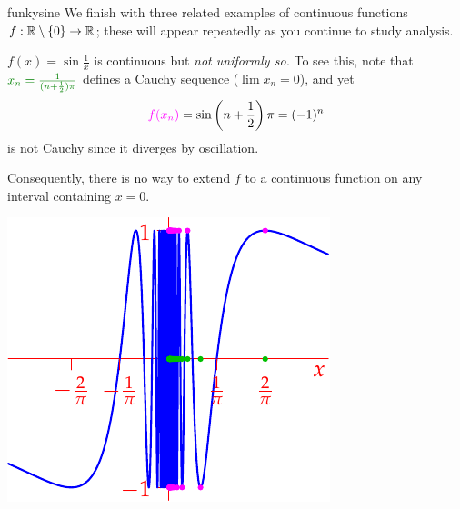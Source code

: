 \begin{examples}{}{funkysine}
	We finish with three related examples of continuous functions $f:\mathbb{R}\setminus\{0\}\to\mathbb{R}$; these will appear repeatedly as you continue to study analysis.
	\begin{enumerate}		
		\begin{minipage}[t]{0.6\linewidth}\vspace{0pt}
			\item $f(x)=\sin\frac 1x$ is continuous but \emph{not uniformly so.} To see this, note that $\textcolor{Green}{x_n=\frac 1{(n+\frac 12)\pi}}$ defines a Cauchy sequence ($\lim x_n=0$), and yet
			\[\textcolor{Magenta}{f(x_n)}=\sin\left(n+\frac 12\right)\pi=(-1)^n\]
			is not Cauchy since it diverges by oscillation.\par
			Consequently, there is no way to extend $f$ to a continuous function on any interval containing $x=0$.
		\end{minipage}
		\hfill
		\begin{minipage}[t]{0.39\linewidth}\vspace{0pt}
			\flushright\includegraphics[scale=0.98]{unifcontex3}
		\end{minipage}\par
	  

\end{enumerate}
\end{examples}
